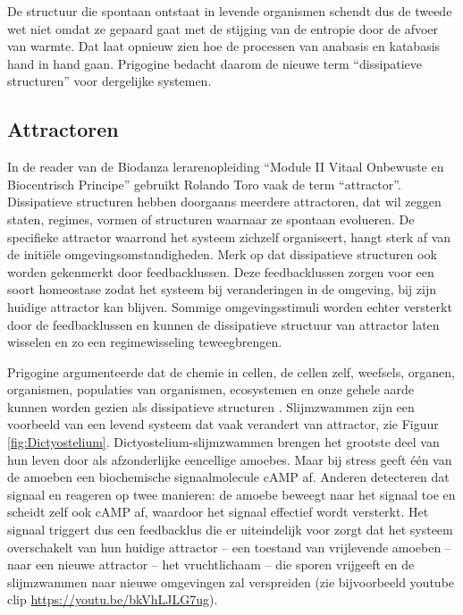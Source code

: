 \documentclass[
  11pt,
]{book}
\begin{document}
De structuur die spontaan ontstaat in levende organismen schendt dus de tweede wet niet omdat ze gepaard gaat met de stijging van de entropie door de afvoer van warmte. Dat laat opnieuw zien hoe de processen van anabasis en katabasis hand in hand gaan. Prigogine bedacht daarom de nieuwe term ``dissipatieve structuren'' voor dergelijke systemen.

\hypertarget{attractoren}{%
\subsection{Attractoren}\label{attractoren}}

In de reader van de Biodanza lerarenopleiding ``Module II Vitaal Onbewuste en Biocentrisch Principe'' gebruikt Rolando Toro vaak de term ``attractor''. Dissipatieve structuren hebben doorgaans meerdere attractoren, dat wil zeggen staten, regimes, vormen of structuren waarnaar ze spontaan evolueren. De specifieke attractor waarrond het systeem zichzelf organiseert, hangt sterk af van de initiële omgevingsomstandigheden. Merk op dat dissipatieve structuren ook worden gekenmerkt door feedbacklussen. Deze feedbacklussen zorgen voor een soort homeostase zodat het systeem bij veranderingen in de omgeving, bij zijn huidige attractor kan blijven. Sommige omgevingsstimuli worden echter versterkt door de feedbacklussen en kunnen de dissipatieve structuur van attractor laten wisselen en zo een regimewisseling teweegbrengen.

Prigogine argumenteerde dat de chemie in cellen, de cellen zelf, weefsels, organen, organismen, populaties van organismen, ecosystemen en onze gehele aarde kunnen worden gezien als dissipatieve structuren \citep{prigogineStengers1984}.
Slijmzwammen zijn een voorbeeld van een levend systeem dat vaak verandert van attractor, zie Figuur \ref{fig:Dictyostelium}. Dictyostelium-slijmzwammen brengen het grootste deel van hun leven door als afzonderlijke eencellige amoebes. Maar bij stress geeft één van de amoeben een biochemische signaalmolecule cAMP af. Anderen detecteren dat signaal en reageren op twee manieren: de amoebe beweegt naar het signaal toe en scheidt zelf ook cAMP af, waardoor het signaal effectief wordt versterkt. Het signaal triggert dus een feedbacklus die er uiteindelijk voor zorgt dat het systeem overschakelt van hun huidige attractor -- een toestand van vrijlevende amoeben -- naar een nieuwe attractor -- het vruchtlichaam -- die sporen vrijgeeft en de slijmzwammen naar nieuwe omgevingen zal verspreiden (zie bijvoorbeeld youtube clip \url{https://youtu.be/bkVhLJLG7ug}).
\end{document}
